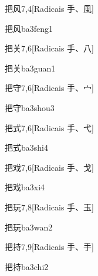 \begin{entry}{把风}{7,4}[Radicais ⼿、⾵]
  \begin{phonetics}{把风}{ba3feng1}
  \end{phonetics}
\end{entry}

\begin{entry}{把关}{7,6}[Radicais ⼿、⼋]
  \begin{phonetics}{把关}{ba3guan1}
  \end{phonetics}
\end{entry}

\begin{entry}{把守}{7,6}[Radicais ⼿、⼧]
  \begin{phonetics}{把守}{ba3shou3}
  \end{phonetics}
\end{entry}

\begin{entry}{把式}{7,6}[Radicais ⼿、⼷]
  \begin{phonetics}{把式}{ba3shi4}
  \end{phonetics}
\end{entry}

\begin{entry}{把戏}{7,6}[Radicais ⼿、⼽]
  \begin{phonetics}{把戏}{ba3xi4}
  \end{phonetics}
\end{entry}

\begin{entry}{把玩}{7,8}[Radicais ⼿、⽟]
  \begin{phonetics}{把玩}{ba3wan2}
  \end{phonetics}
\end{entry}

\begin{entry}{把持}{7,9}[Radicais ⼿、⼿]
  \begin{phonetics}{把持}{ba3chi2}
  \end{phonetics}
\end{entry}

